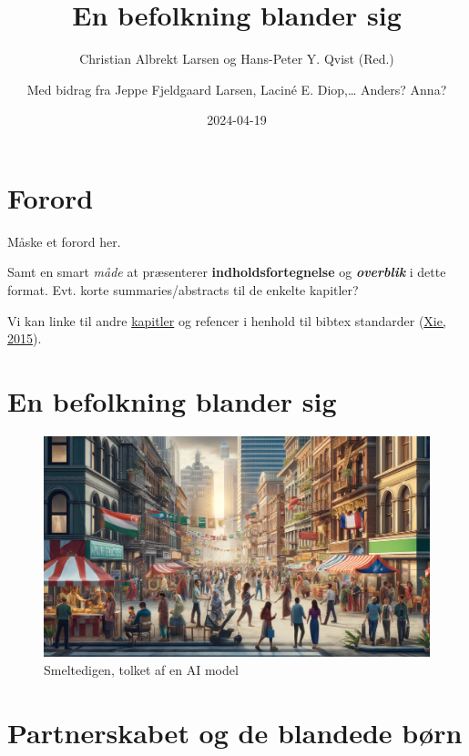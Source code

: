 \documentclass[
]{book}
\title{En befolkning blander sig}
\author{Christian Albrekt Larsen og Hans-Peter Y. Qvist (Red.) \and Med bidrag fra Jeppe Fjeldgaard Larsen, Laciné E. Diop,\ldots{} Anders? Anna?}
\date{2024-04-19}
\begin{document}
\maketitle

{
\setcounter{tocdepth}{1}
\tableofcontents
}
\hypertarget{forord}{%
\chapter*{Forord}\label{forord}}

Måske et forord her.

Samt en smart \emph{måde} at præsenterer \textbf{indholdsfortegnelse} og \textbf{\emph{overblik}} i dette format. Evt. korte summaries/abstracts til de enkelte kapitler?

Vi kan linke til andre \protect\hyperlink{kap1}{kapitler} og refencer i henhold til bibtex standarder (\protect\hyperlink{ref-xie2015}{Xie, 2015}).

\hypertarget{kap1}{%
\chapter{En befolkning blander sig}\label{kap1}}

\begin{figure}
\includegraphics[width=24.89in]{images/dalle-smeltedige} \caption{Smeltedigen, tolket af en AI model}\label{fig:fig-smelte}
\end{figure}

\hypertarget{kap2}{%
\chapter{Partnerskabet og de blandede børn}\label{kap2}}
\end{document}
